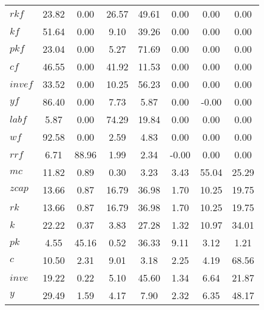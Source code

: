 \begin{center}
\begin{longtable}{lccccccc}
$rkf      $	 & 	     23.82	 & 	      0.00	 & 	     26.57	 & 	     49.61	 & 	      0.00	 & 	      0.00	 & 	      0.00 \\ 
$kf       $	 & 	     51.64	 & 	      0.00	 & 	      9.10	 & 	     39.26	 & 	      0.00	 & 	      0.00	 & 	      0.00 \\ 
$pkf      $	 & 	     23.04	 & 	      0.00	 & 	      5.27	 & 	     71.69	 & 	      0.00	 & 	      0.00	 & 	      0.00 \\ 
$cf       $	 & 	     46.55	 & 	      0.00	 & 	     41.92	 & 	     11.53	 & 	      0.00	 & 	      0.00	 & 	      0.00 \\ 
$invef    $	 & 	     33.52	 & 	      0.00	 & 	     10.25	 & 	     56.23	 & 	      0.00	 & 	      0.00	 & 	      0.00 \\ 
$yf       $	 & 	     86.40	 & 	      0.00	 & 	      7.73	 & 	      5.87	 & 	      0.00	 & 	     -0.00	 & 	      0.00 \\ 
$labf     $	 & 	      5.87	 & 	      0.00	 & 	     74.29	 & 	     19.84	 & 	      0.00	 & 	      0.00	 & 	      0.00 \\ 
$wf       $	 & 	     92.58	 & 	      0.00	 & 	      2.59	 & 	      4.83	 & 	      0.00	 & 	      0.00	 & 	      0.00 \\ 
$rrf      $	 & 	      6.71	 & 	     88.96	 & 	      1.99	 & 	      2.34	 & 	     -0.00	 & 	      0.00	 & 	      0.00 \\ 
$mc       $	 & 	     11.82	 & 	      0.89	 & 	      0.30	 & 	      3.23	 & 	      3.43	 & 	     55.04	 & 	     25.29 \\ 
$zcap     $	 & 	     13.66	 & 	      0.87	 & 	     16.79	 & 	     36.98	 & 	      1.70	 & 	     10.25	 & 	     19.75 \\ 
$rk       $	 & 	     13.66	 & 	      0.87	 & 	     16.79	 & 	     36.98	 & 	      1.70	 & 	     10.25	 & 	     19.75 \\ 
$k        $	 & 	     22.22	 & 	      0.37	 & 	      3.83	 & 	     27.28	 & 	      1.32	 & 	     10.97	 & 	     34.01 \\ 
$pk       $	 & 	      4.55	 & 	     45.16	 & 	      0.52	 & 	     36.33	 & 	      9.11	 & 	      3.12	 & 	      1.21 \\ 
$c        $	 & 	     10.50	 & 	      2.31	 & 	      9.01	 & 	      3.18	 & 	      2.25	 & 	      4.19	 & 	     68.56 \\ 
$inve     $	 & 	     19.22	 & 	      0.22	 & 	      5.10	 & 	     45.60	 & 	      1.34	 & 	      6.64	 & 	     21.87 \\ 
$y        $	 & 	     29.49	 & 	      1.59	 & 	      4.17	 & 	      7.90	 & 	      2.32	 & 	      6.35	 & 	     48.17 \\ 

\end{longtable}
\end{center}
